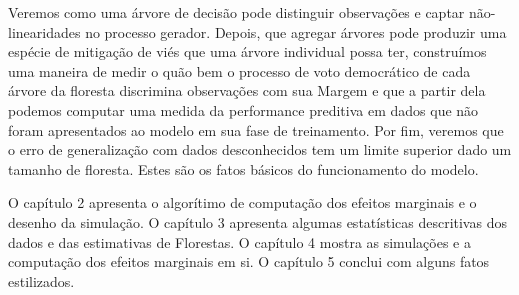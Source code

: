  Veremos como uma árvore de decisão pode distinguir observações e captar não-linearidades no processo gerador. Depois, que agregar árvores pode produzir uma espécie de mitigação de viés que uma árvore individual possa ter, construímos uma maneira de medir o quão bem o processo de voto democrático de cada árvore da floresta discrimina observações com sua Margem e que a partir dela podemos computar uma medida da performance preditiva em dados que não foram apresentados ao modelo em sua fase de treinamento. Por fim, veremos que o erro de generalização com dados desconhecidos tem um limite superior dado um tamanho de floresta. Estes são os fatos básicos do funcionamento do modelo.
 
 
 
 O capítulo 2 apresenta o algorítimo de computação dos efeitos marginais e o desenho da simulação. O capítulo 3 apresenta algumas estatísticas descritivas dos dados e das estimativas de Florestas. O capítulo 4 mostra as simulações e a computação dos efeitos marginais em si. O capítulo 5 conclui com alguns fatos estilizados.



